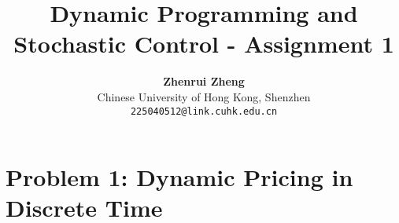 \documentclass[11pt, a4paper, oneside]{memoir}
\title{\huge\textbf{Dynamic Programming and Stochastic Control - Assignment 1}\vspace{-0.5cm}}
\author{\textbf{Zhenrui Zheng} \vspace{0.5cm} \\ \small Chinese University of Hong Kong, Shenzhen \\ \small\texttt{225040512@link.cuhk.edu.cn}}
\date{}
\begin{document}
\begin{titlingpage}
  \maketitle
  \renewcommand{\contentsname}{\huge Contents \vspace{-1cm}}
  \begin{KeepFromToc} %
    \tableofcontents
  \end{KeepFromToc}
\end{titlingpage}

\chapter{Problem 1: Dynamic Pricing in Discrete Time}
\end{document}
